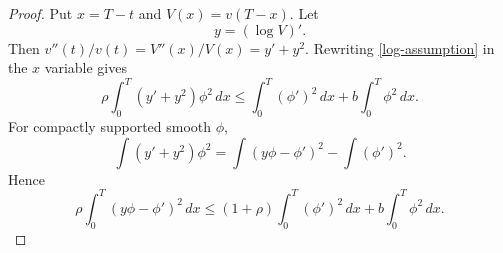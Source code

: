 \documentclass[10pt,a4paper]{amsart}
\numberwithin{equation}{section}
\begin{document}
\begin{proof}
Put $x=T-t$ and $V(x)=v(T-x)$.  Let
$$
        y=(\log V)' .
$$
Then $v''(t)/v(t)=V''(x)/V(x)=y'+y^2$.  Rewriting \eqref{log-assumption} in the $x$ variable gives
$$
        \rho\int_0^T (y'+y^2)\phi^2\,dx
        \leq
        \int_0^T (\phi')^2\,dx+b\int_0^T\phi^2\,dx .
$$
For compactly supported smooth $\phi$,
\begin{equation}\label{square-identity}
        \int (y'+y^2)\phi^2
        =\int (y\phi-\phi')^2-\int (\phi')^2 .
\end{equation}
Hence
\begin{equation}\label{square-bound}
        \rho\int_0^T (y\phi-\phi')^2\,dx
        \leq
        (1+\rho)\int_0^T(\phi')^2\,dx+b\int_0^T\phi^2\,dx .
\end{equation}


\end{proof}
\end{document}
